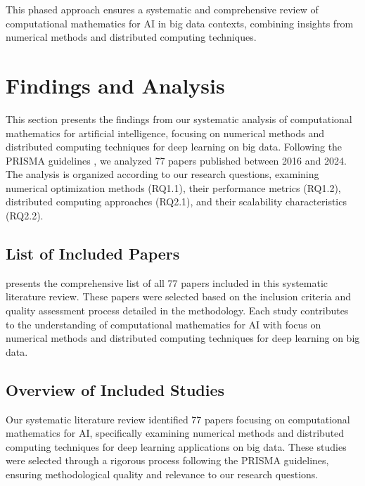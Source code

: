 \documentclass[format=acmsmall, natbib=true, citestyle=acmauthoryear]{acmart}
\begin{document}
This phased approach ensures a systematic and comprehensive review of computational mathematics for AI in big data contexts, combining insights from numerical methods and distributed computing techniques.

\section{Findings and Analysis}\label{sec:findings-and-analysis}
This section presents the findings from our systematic analysis of computational mathematics for artificial intelligence, focusing on numerical methods and distributed computing techniques for deep learning on big data. Following the PRISMA guidelines \citep{moher2009preferred}, we analyzed 77 papers published between 2016 and 2024. The analysis is organized according to our research questions, examining numerical optimization methods (RQ1.1), their performance metrics (RQ1.2), distributed computing approaches (RQ2.1), and their scalability characteristics (RQ2.2).


\subsection{List of Included Papers}\label{subsec:list-of-included-papers}
 presents the comprehensive list of all 77 papers included in this systematic literature review. These papers were selected based on the inclusion criteria and quality assessment process detailed in the methodology. Each study contributes to the understanding of computational mathematics for AI with focus on numerical methods and distributed computing techniques for deep learning on big data.



\subsection{Overview of Included Studies}\label{subsec:overview-of-included-studies}
Our systematic literature review identified 77 papers focusing on computational mathematics for AI, specifically examining numerical methods and distributed computing techniques for deep learning applications on big data. These studies were selected through a rigorous process following the PRISMA guidelines, ensuring methodological quality and relevance to our research questions.
\end{document}
